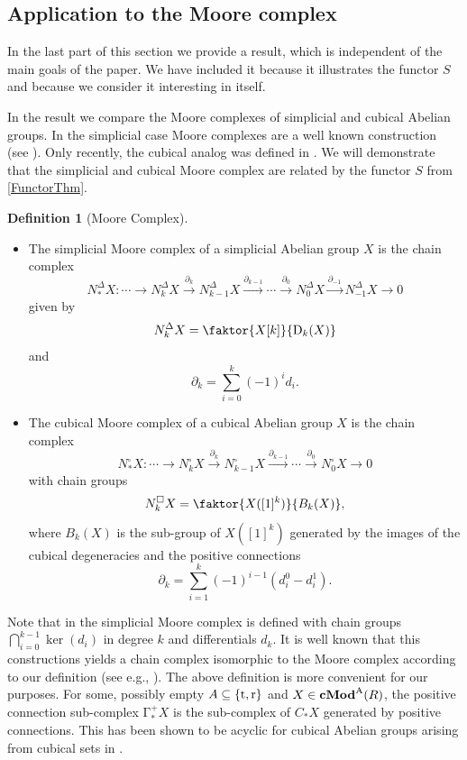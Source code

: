 \documentclass[12pt]{amsart}
\theoremstyle{plain}
\numberwithin{lemma}{\DefaultNumberTheoremWithin}
\numberwithin{claim}{\DefaultNumberTheoremWithin}
\numberwithin{theorem}{\DefaultNumberTheoremWithin}
\numberwithin{corollary}{\DefaultNumberTheoremWithin}
\numberwithin{proposition}{\DefaultNumberTheoremWithin}
\numberwithin{conjecture}{\DefaultNumberTheoremWithin}
\theoremstyle{definition}
\newtheorem*{definition}{Definition}
\theoremstyle{definition}
\numberwithin{question}{\DefaultNumberTheoremWithin}
\theoremstyle{definition}
\numberwithin{problem}{\DefaultNumberTheoremWithin}
\theoremstyle{remark}
\numberwithin{remark}{\DefaultNumberTheoremWithin}
\theoremstyle{remark}
\numberwithin{example}{\DefaultNumberTheoremWithin}
\def\blt{*}
\def\one{[1]}
\def\rev{\textnormal{r}}
\def\trp{\textnormal{t}}
\def\Deg{\mathrm{D}}    %
\def\Con{\mathrm{\Gamma}}  %
\def\posCon{\Con^+} %
\newcommand{\cMod}[2]{\mathbf{cMod}^{\textnormal{#1}}(#2)}  %
\newcommand{\SimpMoore}[1]{N_{#1}^\Delta} %
\newcommand{\CubMoore}[1]{N_{#1}^\square} %
\newcommand{\firstappearence}[1]{{\sf #1}}
\begin{document}
\subsection{Application to the Moore complex}\label{subsec:FunApplication}
In the last part of this section we provide a result, which is 
independent of the main goals of the paper. 
We have included it because it illustrates the functor $S$ and because we consider it interesting in itself.

In the result we compare the Moore complexes of simplicial and
cubical Abelian groups. In the simplicial case Moore complexes are a well known construction
(see \cite[Definition 8.3.6]{WeibelBook}).
Only recently, the cubical analog was defined in \cite{CKT}. We will demonstrate that the
simplicial and cubical Moore complex are related by the functor $S$ from \ref{FunctorThm}. 

\begin{definition}[Moore Complex]~

    \begin{itemize}
        \item The \firstappearence{simplicial Moore complex} of a simplicial Abelian group $X$ is the chain complex  $$\SimpMoore{\blt} X \colon
    \cdots \rightarrow \SimpMoore{k}X \xrightarrow{\partial_k} \SimpMoore{k-1} X \xrightarrow{\partial_{k-1}} \cdots \xrightarrow{\partial_0} \SimpMoore{0} X
    \xrightarrow{\partial_{-1}} \SimpMoore{-1} X \rightarrow 0$$  given by $$\SimpMoore{k}X= \faktor{X[k]}{\Deg_k(X)}$$ 
    and 
    \[
    \partial_k = \sum_{i=0}^k(-1)^i d_i.
    \]
        \item The \firstappearence{cubical Moore complex} of a cubical Abelian group $X$ is the chain complex  $$\CubMoore{\blt} X \colon
    \cdots \rightarrow \CubMoore{k}X \xrightarrow{\partial_k} \CubMoore{k-1} X \xrightarrow{\partial_{k-1}} \cdots \xrightarrow{\partial_0} \CubMoore{0} X
     \rightarrow 0$$  with chain groups $$\CubMoore{k}X= \faktor{X(\one^k)}{B_k (X)},$$ 
    where $B_k (X)$ is the sub-group of 
    $X(\one^k)$ generated by the images of the cubical degeneracies and the positive connections
    \[
    \partial_k = \sum_{i=1}^k(-1)^{i-1} (d_i^0-d_i^1).
    \]
    \end{itemize}
    \end{definition} 
    
    Note that in \cite[Definition 8.3.6]{WeibelBook} the simplicial Moore complex is defined 
    with chain groups $\bigcap_{i=0}^{k-1}\ker(d_i)$ in degree $k$ and differentials $d_k$. It is well known that this constructions yields a chain complex
    isomorphic to the Moore complex according to our definition (see e.g., \cite[Theorem III.2.1]{JardineGoerss}). The above definition is more convenient for our purposes. 
    For some, possibly empty $A\subseteq \{\trp,\rev \} $ and $ X\in \cMod{A}{R}$, the \firstappearence{positive connection sub-complex} $\posCon_*X$ is the sub-complex of $C_\blt X$ generated by positive connections.
     This has been shown to be acyclic for cubical Abelian groups arising from cubical sets in \cite{HomologyConnections}.
    
\end{document}
